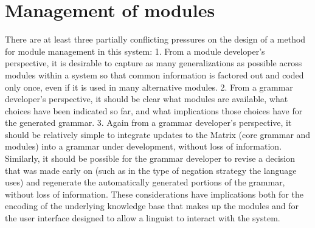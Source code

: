 \documentclass[11pt]{article}
\begin{document}
\section{Management of modules}
\label{management}

There are at least three partially conflicting pressures on the design
of a method for module management in this system: 1. From a module developer's
perspective, it is desirable to capture as many generalizations as
possible across modules within a system so that common information is
factored out and coded only once, even if it is used in many
alternative modules. 2. From a grammar developer's perspective, it should be clear
what modules are available, what choices have been indicated so far,
and what implications those choices have for the generated grammar.
3. Again from a grammar developer's perspective, it should be relatively simple to
integrate updates to the Matrix (core grammar and modules) into a
grammar under development, without loss of information.
Similarly, it should be possible for the grammar
developer to revise a decision that was made early on (such as in the
type of negation strategy the language uses) and regenerate the
automatically generated portions of the grammar, without loss of
information.  These considerations have implications both for the
encoding of the underlying knowledge base that makes up the modules
and for the user interface designed to allow a linguist to interact
with the system.
\end{document}

